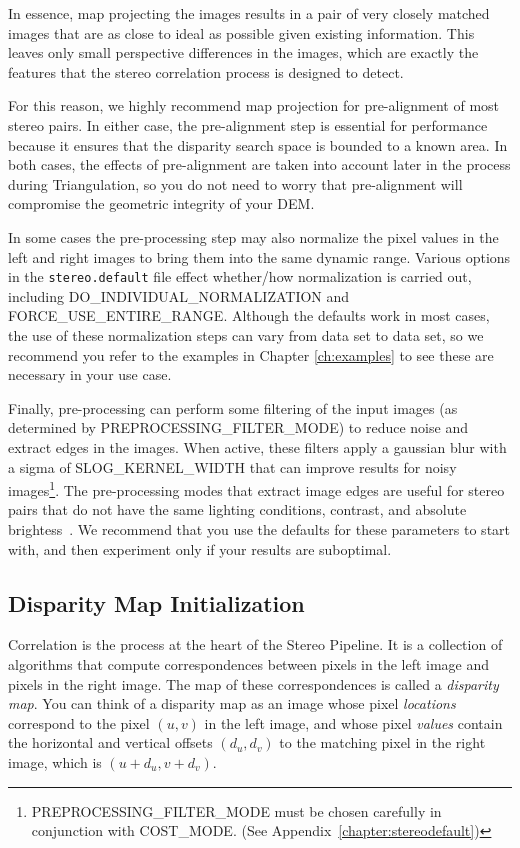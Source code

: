 In essence, map projecting the images results in a pair of very
closely matched images that are as close to ideal as possible given
existing information.  This leaves only small perspective differences
in the images, which are exactly the features that the stereo
correlation process is designed to detect.  

For this reason, we highly recommend map projection for pre-alignment
of most stereo pairs.  In either case, the pre-alignment step is
essential for performance because it ensures that the disparity search
space is bounded to a known area.  In both cases, the effects of
pre-alignment are taken into account later in the process during
Triangulation, so you do not need to worry that pre-alignment will
compromise the geometric integrity of your DEM.

In some cases the pre-processing step may also normalize the pixel
values in the left and right images to bring them into the same
dynamic range.  Various options in the {\tt stereo.default} file
effect whether/how normalization is carried out, including
DO\_INDIVIDUAL\_NORMALIZATION and FORCE\_USE\_ENTIRE\_RANGE.  Although
the defaults work in most cases, the use of these normalization steps
can vary from data set to data set, so we recommend you refer to the
examples in Chapter \ref{ch:examples} to see these are necessary in
your use case.

Finally, pre-processing can perform some filtering of the input images
(as determined by PREPROCESSING\_FILTER\_MODE) to reduce noise and
extract edges in the images.  When active, these filters apply a
gaussian blur with a sigma of SLOG\_KERNEL\_WIDTH that can improve
results for noisy images\footnote{PREPROCESSING\_FILTER\_MODE must be
  chosen carefully in conjunction with COST\_MODE.  (See
  Appendix~\ref{chapter:stereodefault})}.  The
pre-processing modes that extract image edges are useful for stereo
pairs that do not have the same lighting conditions, contrast, and
absolute brightess~\cite{Nishihara84practical}.  We recommend that you
use the defaults for these parameters to start with, and then
experiment only if your results are suboptimal.

\subsection{Disparity Map Initialization}

Correlation is the process at the heart of the Stereo Pipeline.  It is
a collection of algorithms that compute correspondences between pixels
in the left image and pixels in the right image.  The map of these
correspondences is called a {\em disparity map}.  You can think of a
disparity map as an image whose pixel {\em locations} correspond to
the pixel $(u,v)$ in the left image, and whose pixel {\em values}
contain the horizontal and vertical offsets $(d_u, d_v)$ to the
matching pixel in the right image, which is $(u+d_u, v+d_v)$.  

